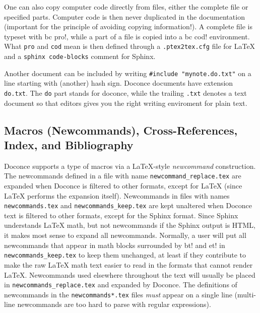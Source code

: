 \documentclass[twoside]{article}
\begin{document}

One can also copy computer code directly from files, either the
complete file or specified parts.  Computer code is then never
duplicated in the documentation (important for the principle of
avoiding copying information!). A complete file is typeset
with {\fontsize{10pt}{10pt}\verb!!bc pro!}, while a part of a file is copied into a {\fontsize{10pt}{10pt}\verb!!bc cod!}
environment. What {\fontsize{10pt}{10pt}\verb!pro!} and {\fontsize{10pt}{10pt}\verb!cod!} mean is then defined through
a {\fontsize{10pt}{10pt}\verb!.ptex2tex.cfg!} file for {\LaTeX} and a {\fontsize{10pt}{10pt}\verb!sphinx code-blocks!}
comment for Sphinx.

Another document can be included by writing {\fontsize{10pt}{10pt}\verb!#include "mynote.do.txt"!}
on a line starting with (another) hash sign.  Doconce documents have
extension {\fontsize{10pt}{10pt}\verb!do.txt!}. The {\fontsize{10pt}{10pt}\verb!do!} part stands for doconce, while the
trailing {\fontsize{10pt}{10pt}\verb!.txt!} denotes a text document so that editors gives you the
right writing enviroment for plain text.

\subsection{Macros (Newcommands), Cross-References, Index, and Bibliography}

\label{newcommands}

Doconce supports a type of macros via a LaTeX-style \emph{newcommand}
construction.  The newcommands defined in a file with name
{\fontsize{10pt}{10pt}\verb!newcommand_replace.tex!} are expanded when Doconce is filtered to
other formats, except for {\LaTeX} (since {\LaTeX} performs the expansion
itself).  Newcommands in files with names {\fontsize{10pt}{10pt}\verb!newcommands.tex!} and
{\fontsize{10pt}{10pt}\verb!newcommands_keep.tex!} are kept unaltered when Doconce text is
filtered to other formats, except for the Sphinx format. Since Sphinx
understands {\LaTeX} math, but not newcommands if the Sphinx output is
HTML, it makes most sense to expand all newcommands.  Normally, a user
will put all newcommands that appear in math blocks surrounded by
{\fontsize{10pt}{10pt}\verb!!bt!} and {\fontsize{10pt}{10pt}\verb!!et!} in {\fontsize{10pt}{10pt}\verb!newcommands_keep.tex!} to keep them unchanged, at
least if they contribute to make the raw {\LaTeX} math text easier to
read in the formats that cannot render {\LaTeX}.  Newcommands used
elsewhere throughout the text will usually be placed in
{\fontsize{10pt}{10pt}\verb!newcommands_replace.tex!} and expanded by Doconce.  The definitions of
newcommands in the {\fontsize{10pt}{10pt}\verb!newcommands*.tex!} files \emph{must} appear on a single
line (multi-line newcommands are too hard to parse with regular
expressions).
\end{document}
